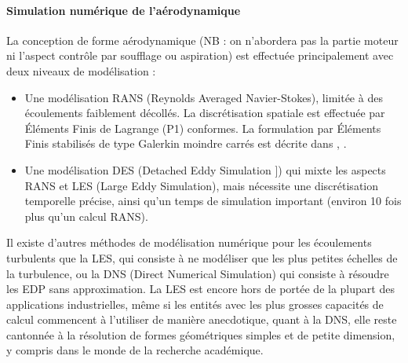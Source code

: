 \paragraph{Simulation numérique de l'aérodynamique}
La conception de forme aérodynamique (NB : on n'abordera pas la partie moteur ni l'aspect contrôle par soufflage ou aspiration) est effectuée principalement avec deux niveaux de modélisation :
\begin{itemize}[label=$\bullet$]
    \item Une modélisation RANS  (Reynolds Averaged Navier-Stokes), limitée à des écoulements faiblement décollés. La discrétisation spatiale est effectuée par Éléments Finis de Lagrange (P1) conformes. La formulation par Éléments Finis stabilisés de type Galerkin moindre carrés est décrite dans \citep{Hughes1986}, \citep{Chalot2004}.
    \item Une modélisation DES  (Detached Eddy Simulation \citep{Chalot2015}]) qui mixte les aspects RANS et LES  (Large Eddy Simulation), mais nécessite une discrétisation temporelle précise, ainsi qu'un temps de simulation important (environ 10 fois plus qu'un calcul RANS).
\end{itemize}

Il existe d'autres méthodes de modélisation numérique pour les écoulements turbulents que la LES, qui consiste à ne modéliser que les plus petites échelles de la turbulence, ou la DNS (Direct Numerical Simulation) qui consiste à résoudre les EDP sans approximation. La LES est encore hors de portée de la plupart des applications industrielles, même si les entités avec les plus grosses capacités de calcul commencent à l'utiliser de manière anecdotique, quant à la DNS, elle reste cantonnée à la résolution de formes géométriques simples et de petite dimension, y compris dans le monde de la recherche académique.


